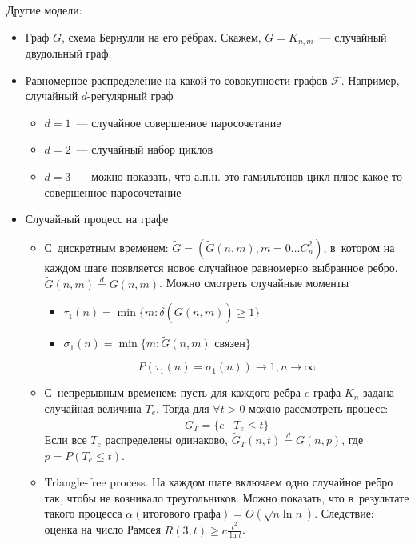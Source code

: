 \documentclass{article}
\begin{document}
Другие модели:
\begin{itemize}
	\item Граф $G$, схема Бернулли на его рёбрах. Скажем, $G = K_{n,m}$~---
		случайный двудольный граф.
	\item Равномерное распределение на какой-то совокупности графов $\mathcal{F}$.
		Например, случайный $d$-регулярный граф
		\begin{itemize}
			\item $d = 1$~--- случайное совершенное паросочетание
			\item $d = 2$~--- случайный набор циклов
			\item $d = 3$~--- можно показать, что а.п.н. это гамильтонов цикл плюс
				какое-то совершенное паросочетание
		\end{itemize}
	\item Случайный процесс на графе
		\begin{itemize}
			\item С~дискретным временем: $\tilde{G} = (\tilde{G}(n,m), m = 0 \ldots
				C_n^2)$, в~котором на каждом шаге появляется новое случайное равномерно
				выбранное ребро. $\tilde{G}(n,m) \overset{d}= G(n, m)$. Можно смотреть
				случайные моменты
				\begin{itemize}
					\item $\tau_1(n) = \min\{m: \delta(\tilde{G}(n,m)) \ge 1\}$
					\item $\sigma_1(n) = \min\{m: \tilde{G}(n,m)\text{ связен}\}$
				\end{itemize}
				\begin{theorem}
					$$ P\left(\tau_1(n) = \sigma_1(n)\right) \rightarrow 1, n \rightarrow
					\infty $$
				\end{theorem}
			\item С~непрерывным временем: пусть для каждого ребра $e$ графа $K_n$
				задана случайная величина $T_e$. Тогда для $\forall t > 0$ можно
				рассмотреть процесс:
				$$ \tilde{G}_T = \{e \mid T_e \le t\} $$
				Если все $T_e$ распределены одинаково, $\tilde{G}_T(n,t) \overset{d}=
				G(n, p)$, где $p = P(T_e \le t)$.
			\item Triangle-free process. На каждом шаге включаем одно случайное ребро
				так, чтобы не возникало треугольников. Можно показать, что в~результате
				такого процесса $\alpha(\text{итогового графа}) = O(\sqrt{n \ln n})$.
				Следствие: оценка на число Рамсея $R(3, t) \ge c \frac{t^2}{\ln t}$.
		\end{itemize}
\end{itemize}
\end{document}
